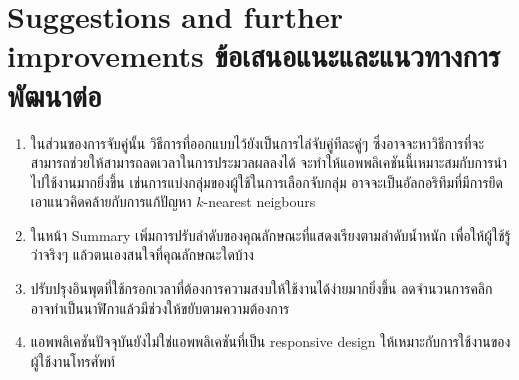 \section{\ifenglish%
Suggestions and further improvements
\else%
ข้อเสนอแนะและแนวทางการพัฒนาต่อ
\fi
}
\begin{enumerate}
  \item ในส่วนของการจับคู่นั้น วิธีการที่ออกแบบไว้ยังเป็นการไล่จับคู่ทีละคู่ๆ ซึ่งอาจจะหาวิธีการที่จะสามารถช่วยให้สามารถลดเวลาในการประมวลผลลงได้ 
  จะทำให้แอพพลิเคชันนี้เหมาะสมกับการนำไปใช้งานมากยิ่งขึ้น เช่นการแบ่งกลุ่มของผู้ใช้ในการเลือกจับกลุ่ม อาจจะเป็นอัลกอริทึมที่มีการยึดเอาแนวคิดคล้ายกับการแก้ปัญหา 
  $k$-nearest neigbours
  \item ในหน้า Summary เพิ่มการปรับลำดับของคุณลักษณะที่แสดงเรียงตามลำดับน้ำหนัก เพื่อให้ผู้ใช้รู้ว่าจริงๆ แล้วตนเองสนใจที่คุณลักษณะใดบ้าง
  \item ปรับปรุงอินพุตที่ใช้กรอกเวลาที่ต้องการความสงบให้ใช้งานได้ง่ายมากยิ่งขึ้น ลดจำนวนการคลิก อาจทำเป็นนาฬิกาแล้วมีช่วงให้ขยับตามความต้องการ
  \item แอพพลิเคชันปัจจุบันยังไม่ใช่แอพพลิเคชันที่เป็น responsive design ให้เหมาะกับการใช้งานของผู้ใช้งานโทรศัพท์
\end{enumerate}









